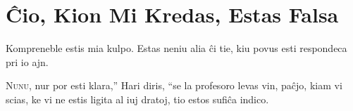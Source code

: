 \chapter{Ĉio, Kion Mi Kredas, Estas Falsa}

\begin{chapterOpeningQuote}
Kompreneble estis mia kulpo.
Estas neniu alia ĉi tie, kiu povus esti respondeca pri io ajn.
\end{chapterOpeningQuote}

\lettrine[ante=“]{N}{unu}, nur por esti klara,” Hari diris, “se la profesoro levas vin, paĉjo, kiam vi scias, ke vi ne estis ligita al iuj dratoj, tio estos sufiĉa indico.










